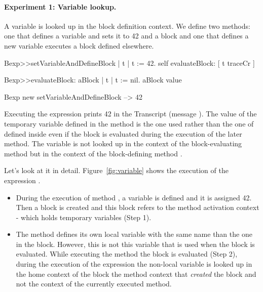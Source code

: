 \documentclass[a4paper,10pt,twoside]{book}
\begin{document}
\paragraph{Experiment 1: Variable lookup.} A variable is looked up in the block definition context. We define two methods: one that defines a variable  and sets it to 42 and a block and one that defines a new variable executes a block defined elsewhere.



\begin{code}{}
Bexp>>setVariableAndDefineBlock
	| t |
	t := 42.
	self evaluateBlock: [ t traceCr ]
	
Bexp>>evaluateBlock: aBlock
	| t |
	t := nil.
	aBlock value	

Bexp new setVariableAndDefineBlock 
--> 42
\end{code}


Executing the  expression prints 42 in the Transcript (message ). The value of the temporary variable  defined in the  method is the one used rather than the one of  defined inside  even if the block is evaluated during the execution of the later method. The variable  is not looked up in the context of the  block-evaluating method  but in the context of the block-defining method .

Let's look at it in detail. Figure~\ref{fig:variable} shows the execution of the expression . 

\begin{itemize}
\item During the execution of method , a variable  is defined and it is assigned 42. Then a block is created and this block refers to the method activation context - which holds temporary variables (Step 1). 

\item The method  defines its own local variable  with the same name than the one in the block. However, this is not this variable that is used when the block is evaluated. While executing the method  the block is evaluated (Step 2), during the execution of the expression  the non-local variable  is looked up in the home context of the block \ie the method context that \emph{created} the block and not the context of the currently executed method.
\end{itemize}
\end{document}
